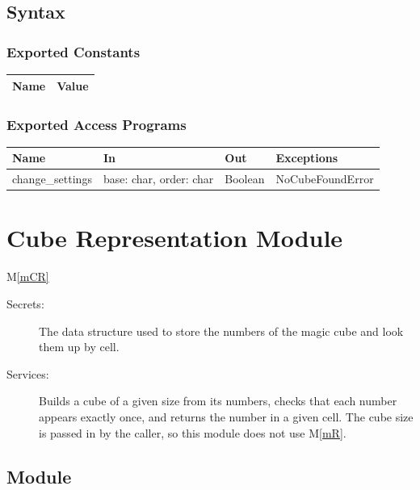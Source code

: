 \documentclass[12pt, titlepage]{article}
\newcommand{\mref}[1]{M\ref{#1}}
\begin{document}
\subsection{Syntax}

\subsubsection{Exported Constants}

\begin{center}
\begin{tabular}{p{10cm} p{4cm}}
\hline
\textbf{Name} & \textbf{Value}\\
\hline


\hline
\end{tabular}
\end{center}

\subsubsection{Exported Access Programs}

\begin{center}
\begin{tabular}{p{4cm} p{4cm} p{4cm} p{4cm}}
\hline
\textbf{Name} & \textbf{In} & \textbf{Out} & \textbf{Exceptions} \\
\hline
change\_settings & base: char, order: char  & Boolean & NoCubeFoundError \\
\hline
\end{tabular}
\end{center}


\newpage

\section{Cube Representation Module} \mref{mCR} 


\begin{description}
\item[Secrets:] The data structure used to store the numbers of the magic cube and look them up by cell.
\item[Services:] Builds a cube of a given size from its numbers, checks that each number appears exactly once, and returns the number in a given cell. The cube size is passed in by the caller, so this module does not use \mref{mR}.
\end{description}

\subsection{Module}
\end{document}
